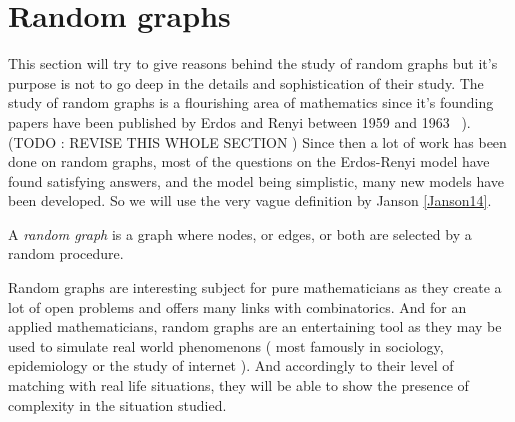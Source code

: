 \section{Random graphs}
This section will try to give reasons behind the study of random graphs but it's purpose is not to go deep in the details and sophistication of their study.
The study of random graphs is a flourishing area of mathematics since it's founding papers have been published by Erdos and Renyi between 1959 and 1963 \cite{erdos59} \cite{erdos60} \cite{erdosconnect61} \cite{erdosevol61} \cite{erdos63}).
(TODO : REVISE THIS WHOLE SECTION )
Since then a lot of work has been done on random graphs, most of the questions on the Erdos-Renyi model have found satisfying answers, and the model being simplistic, many new models have been developed.
So we will use the very vague definition by Janson \ref{Janson14}.
\begin{definition} A \emph{random graph} is a graph where nodes, or edges, or both are selected by a random procedure.
\end{definition}
Random graphs are interesting subject for pure mathematicians as they create a lot of open problems and offers many links with combinatorics. And for an applied mathematicians, random graphs are an entertaining tool as they may be used to simulate real world phenomenons ( most famously in sociology, epidemiology or the study of internet ). And accordingly to their level of matching with real life situations, they will be able to show the presence of complexity in the situation studied.
